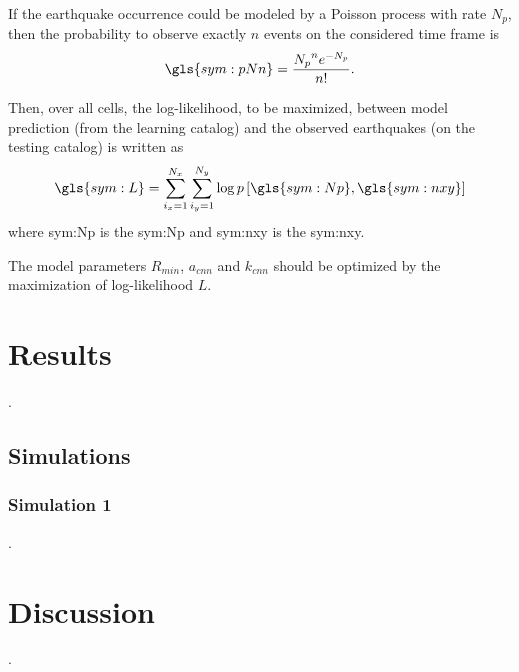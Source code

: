 \documentclass[draft, grl]{agutex}
\begin{document}
\begin{article}
If the earthquake occurrence could be modeled by a Poisson process with rate $N_p$, then the probability to observe exactly $n$ events on the considered time frame is
\begin{equation}
	\ensuremath{
		\gls{sym:pNn} = \frac{{N_p}^n e^{-N_p}}{n!}.
	}
	\label{eq:poisson_probability}
\end{equation}

Then, over all cells, the log-likelihood, to be maximized, between model prediction (from the learning catalog) and the observed earthquakes (on the testing catalog) is written as
\begin{equation}
	\ensuremath{
		\gls{sym:L} = \sum_{i_x=1}^{N_x}\sum_{i_y=1}^{N_y}\log p\left[  \gls{sym:Np}, \gls{sym:nxy}  \right]
	}
	\label{eq:loglik}
\end{equation}
where \gls{sym:Np} is the \glsdesc{sym:Np} and
	  \gls{sym:nxy} is the \glsdesc{sym:nxy}.

The model parameters $R_{min}$, $a_{cnn}$ and $k_{cnn}$ should be optimized by the maximization of log-likelihood $L$.



\section{Results}

.

\subsection{Simulations}

\subsubsection{Simulation 1}

.


\section{Discussion}

.




\end{article}
\end{document}
